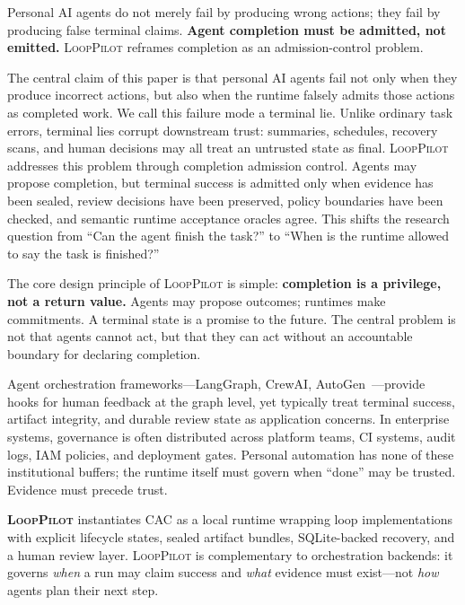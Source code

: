 \documentclass[11pt]{article}
\newcommand{\looppilot}{\textsc{LoopPilot}}
\newcommand{\cac}{\textsc{CAC}}
\begin{document}
Personal AI agents do not merely fail by producing wrong actions; they fail by producing false terminal claims.
\textbf{Agent completion must be admitted, not emitted.}
\looppilot{} reframes completion as an admission-control problem.

The central claim of this paper is that personal AI agents fail not only when they produce incorrect actions, but also when the runtime falsely admits those actions as completed work.
We call this failure mode a terminal lie.
Unlike ordinary task errors, terminal lies corrupt downstream trust: summaries, schedules, recovery scans, and human decisions may all treat an untrusted state as final.
\looppilot{} addresses this problem through completion admission control.
Agents may propose completion, but terminal success is admitted only when evidence has been sealed, review decisions have been preserved, policy boundaries have been checked, and semantic runtime acceptance oracles agree.
This shifts the research question from ``Can the agent finish the task?'' to ``When is the runtime allowed to say the task is finished?''

The core design principle of \looppilot{} is simple: \textbf{completion is a privilege, not a return value.}
Agents may propose outcomes; runtimes make commitments.
A terminal state is a promise to the future.
The central problem is not that agents cannot act, but that they can act without an accountable boundary for declaring completion.

Agent orchestration frameworks---LangGraph, CrewAI, AutoGen~\cite{langgraph2024,crewai2024,autogen2023}---provide hooks for human feedback at the graph level, yet typically treat terminal success, artifact integrity, and durable review state as application concerns.
In enterprise systems, governance is often distributed across platform teams, CI systems, audit logs, IAM policies, and deployment gates.
Personal automation has none of these institutional buffers; the runtime itself must govern when ``done'' may be trusted.
Evidence must precede trust.

\textbf{\looppilot{}} instantiates \cac{} as a local runtime wrapping loop implementations with explicit lifecycle states, sealed artifact bundles, SQLite-backed recovery, and a human review layer.
\looppilot{} is complementary to orchestration backends: it governs \emph{when} a run may claim success and \emph{what} evidence must exist---not \emph{how} agents plan their next step.
\end{document}
